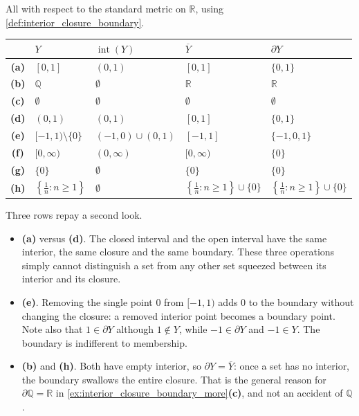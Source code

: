 \begin{exercisesolution}
\label{sol:boundary_interior_closure_drill}
All with respect to the standard metric on $\mathbb{R}$, using
\cref{def:interior_closure_boundary}.
\begin{center}
\begin{tabular}{@{}c l l l l@{}}
& \textbf{$Y$} & \textbf{$\operatorname{int}(Y)$} & \textbf{$\overline{Y}$} & \textbf{$\partial Y$} \\
\hline
\textbf{(a)} & $[0,1]$ & $(0,1)$ & $[0,1]$ & $\{0,1\}$ \\
\textbf{(b)} & $\mathbb{Q}$ & $\emptyset$ & $\mathbb{R}$ & $\mathbb{R}$ \\
\textbf{(c)} & $\emptyset$ & $\emptyset$ & $\emptyset$ & $\emptyset$ \\
\textbf{(d)} & $(0,1)$ & $(0,1)$ & $[0,1]$ & $\{0,1\}$ \\
\textbf{(e)} & $[-1,1)\setminus\{0\}$ & $(-1,0)\cup(0,1)$ & $[-1,1]$ & $\{-1,0,1\}$ \\
\textbf{(f)} & $[0,\infty)$ & $(0,\infty)$ & $[0,\infty)$ & $\{0\}$ \\
\textbf{(g)} & $\{0\}$ & $\emptyset$ & $\{0\}$ & $\{0\}$ \\
\textbf{(h)} & $\left\{\tfrac1n : n \geq 1\right\}$ & $\emptyset$ &
  $\left\{\tfrac1n : n \geq 1\right\}\cup\{0\}$ &
  $\left\{\tfrac1n : n \geq 1\right\}\cup\{0\}$ \\
\end{tabular}
\end{center}

Three rows repay a second look.
\begin{itemize}
  \item \textbf{(a)} versus \textbf{(d)}. The closed interval and the open interval have the same
    interior, the same closure and the same boundary. These three operations simply cannot
    distinguish a set from any other set squeezed between its interior and its closure.
  \item \textbf{(e)}. Removing the single point $0$ from $[-1,1)$ adds $0$ to the boundary
    without changing the closure: a removed interior point becomes a boundary point. Note also
    that $1 \in \partial Y$ although $1 \notin Y$, while $-1 \in \partial Y$ and $-1 \in Y$. The
    boundary is indifferent to membership.
  \item \textbf{(b)} and \textbf{(h)}. Both have empty interior, so $\partial Y = \overline{Y}$:
    once a set has no interior, the boundary swallows the entire closure. That is the general
    reason
    for $\partial\mathbb{Q} = \mathbb{R}$ in
    \cref{ex:interior_closure_boundary_more}\textbf{(c)}, and not an accident of $\mathbb{Q}$.
\end{itemize}
\end{exercisesolution}

